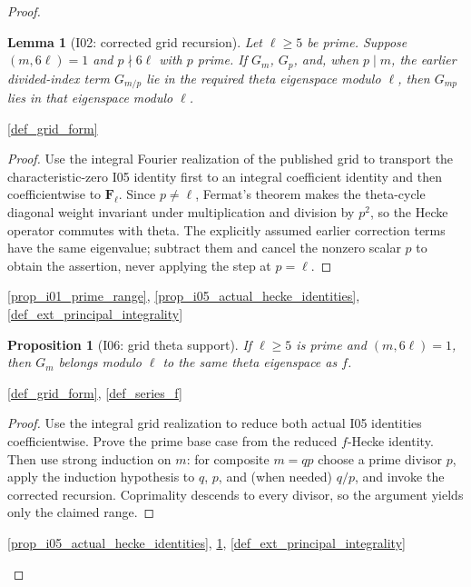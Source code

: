 \documentclass[11pt,a4paper]{article}
\numberwithin{equation}{section}
\theoremstyle{plain}\newtheorem{theorem}{Theorem}[section]\newaliascnt{proposition}{theorem}\newtheorem{proposition}[proposition]{Proposition}\aliascntresetthe{proposition}\newaliascnt{lemma}{theorem}\newtheorem{lemma}[lemma]{Lemma}\aliascntresetthe{lemma}
\theoremstyle{definition}\newaliascnt{definition}{theorem}\newtheorem{definition}[definition]{Definition}\aliascntresetthe{definition}\newaliascnt{notation}{theorem}\newtheorem{notation}[notation]{Notation}\aliascntresetthe{notation}
\providecommand{\lean}[1]{}\providecommand{\leanok}{}
\begin{document}
\begin{proof}
\begin{lemma}[I02: corrected grid recursion]\label{lem_i02_grid_recursion}\lean{SptCM.Analytic.Repaired.actual_modGrid_theta_recursion}\leanok
Let $\ell\ge5$ be prime.  Suppose $(m,6\ell)=1$ and $p\nmid6\ell$ with $p$ prime.  If $G_m$, $G_p$, and, when $p\mid m$, the earlier divided-index term $G_{m/p}$ lie in the required theta eigenspace modulo $\ell$, then $G_{mp}$ lies in that eigenspace modulo $\ell$.
\end{lemma}
\begin{uses-statement}\ref{def_grid_form}\end{uses-statement}
\begin{proof}
Use the integral Fourier realization of the published grid to transport the characteristic-zero I05 identity first to an integral coefficient identity and then coefficientwise to $\mathbf F_\ell$.  Since $p\ne\ell$, Fermat's theorem makes the theta-cycle diagonal weight invariant under multiplication and division by $p^2$, so the Hecke operator commutes with theta.  The explicitly assumed earlier correction terms have the same eigenvalue; subtract them and cancel the nonzero scalar $p$ to obtain the assertion, never applying the step at $p=\ell$.
\end{proof}
\begin{uses-proof}\ref{prop_i01_prime_range}, \ref{prop_i05_actual_hecke_identities}, \ref{def_ext_principal_integrality}\end{uses-proof}

\begin{proposition}[I06: grid theta support]\label{prop_i06_grid_support}\lean{SptCM.Analytic.Repaired.actual_modGrid_theta_support}\leanok
If $\ell\ge5$ is prime and $(m,6\ell)=1$, then $G_m$ belongs modulo $\ell$ to the same theta eigenspace as $f$.
\end{proposition}
\begin{uses-statement}\ref{def_grid_form}, \ref{def_series_f}\end{uses-statement}
\begin{proof}
Use the integral grid realization to reduce both actual I05 identities coefficientwise.  Prove the prime base case from the reduced $f$-Hecke identity.  Then use strong induction on $m$: for composite $m=qp$ choose a prime divisor $p$, apply the induction hypothesis to $q$, $p$, and (when needed) $q/p$, and invoke the corrected recursion.  Coprimality descends to every divisor, so the argument yields only the claimed range.
\end{proof}
\begin{uses-proof}\ref{prop_i05_actual_hecke_identities}, \ref{lem_i02_grid_recursion}, \ref{def_ext_principal_integrality}\end{uses-proof}


\end{proof}
\end{document}
